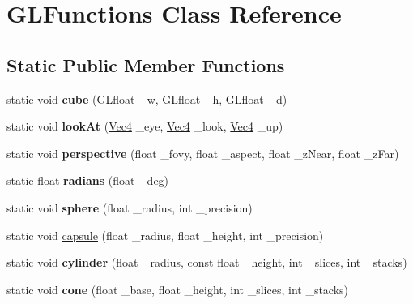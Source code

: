 \hypertarget{classGLFunctions}{
\section{GLFunctions Class Reference}
\label{classGLFunctions}
}
\subsection*{Static Public Member Functions}
\begin{DoxyCompactItemize}
\item 
\hypertarget{classGLFunctions_ab92c07964bf3b5c1459a68e47874d9d4}{
static void {\bfseries cube} (GLfloat \_\-w, GLfloat \_\-h, GLfloat \_\-d)}
\label{classGLFunctions_ab92c07964bf3b5c1459a68e47874d9d4}

\item 
\hypertarget{classGLFunctions_aa39dce57b78e89c63d1f4178d4ece2e3}{
static void {\bfseries lookAt} (\hyperlink{classVec4}{Vec4} \_\-eye, \hyperlink{classVec4}{Vec4} \_\-look, \hyperlink{classVec4}{Vec4} \_\-up)}
\label{classGLFunctions_aa39dce57b78e89c63d1f4178d4ece2e3}

\item 
\hypertarget{classGLFunctions_a5099e8a045d3531946fd609a68a9b240}{
static void {\bfseries perspective} (float \_\-fovy, float \_\-aspect, float \_\-zNear, float \_\-zFar)}
\label{classGLFunctions_a5099e8a045d3531946fd609a68a9b240}

\item 
\hypertarget{classGLFunctions_acc960c554d73ac346656f19c5cb24abe}{
static float {\bfseries radians} (float \_\-deg)}
\label{classGLFunctions_acc960c554d73ac346656f19c5cb24abe}

\item 
\hypertarget{classGLFunctions_aacaf6e574b5736a0560fc6ec194646d4}{
static void {\bfseries sphere} (float \_\-radius, int \_\-precision)}
\label{classGLFunctions_aacaf6e574b5736a0560fc6ec194646d4}

\item 
static void \hyperlink{classGLFunctions_a6f2d4c4c3f5d69b365dffcef7f46654b}{capsule} (float \_\-radius, float \_\-height, int \_\-precision)
\item 
\hypertarget{classGLFunctions_ab67c95f46f99bbb79c081dd83feff020}{
static void {\bfseries cylinder} (float \_\-radius, const float \_\-height, int \_\-slices, int \_\-stacks)}
\label{classGLFunctions_ab67c95f46f99bbb79c081dd83feff020}

\item 
\hypertarget{classGLFunctions_af6e44b48540dd6fa385142f9e4a107ea}{
static void {\bfseries cone} (float \_\-base, float \_\-height, int \_\-slices, int \_\-stacks)}
\label{classGLFunctions_af6e44b48540dd6fa385142f9e4a107ea}


\end{DoxyCompactItemize}
